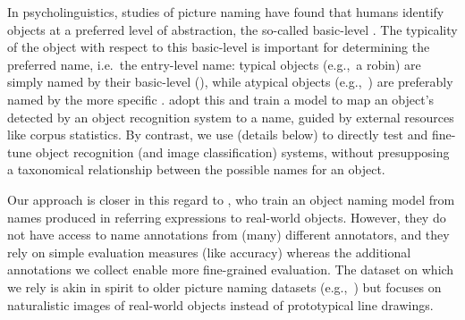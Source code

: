 
%
In psycholinguistics, studies of picture naming have found that humans identify objects at a preferred level of abstraction, the so-called basic-level \cite{rosch1976basic,jolicoeur1984pictures}. 
The typicality of the object with respect to this basic-level is important for determining the preferred name, i.e.\ the entry-level name: typical objects (e.g.,\ a robin) are simply named by their basic-level \category (), while atypical objects (e.g.,\ ) are preferably named by the more specific \category.
 adopt this and train a model to map an object's \category detected by an object recognition system to a name, guided by external resources like corpus statistics.
By contrast, we use \mn (details below) to directly test and fine-tune object recognition (and image classification) systems, without presupposing a taxonomical relationship between the possible names for an object.

Our approach is closer in this regard to , who train an object naming model from names produced in referring expressions to real-world objects.
However, they do not have access to name annotations from (many) different annotators, and they rely on simple evaluation measures (like accuracy) whereas the additional annotations we collect enable more fine-grained evaluation.
The \mn dataset on which we rely is akin in spirit to older picture naming datasets (e.g.,~) but focuses on naturalistic images of real-world objects instead of prototypical line drawings.

